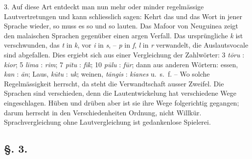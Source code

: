 \label{III.I.I.2B3}3. Auf diese Art entdeckt man nun mehr oder minder regelmässige Lautvertretungen und kann schliesslich sagen: Kehrt das und das Wort in jener Sprache wieder, so muss es so und so lauten. Das Mafoor von Neuguinea zeigt den malaischen Sprachen gegenüber einen argen Verfall. Das ursprüngliche \textit{k} ist verschwunden, das \textit{t} in \textit{k}, vor \textit{i} in \textit{s}, – \textit{p} in \textit{f}, \textit{l} in \textit{r} verwandelt, die Auslautsvocale sind abgefallen. Dies ergiebt sich aus einer Vergleichung der Zahlwörter: 3 \textit{tōru} : \textit{kior}; 5 \textit{līma} : \textit{rim}; 7 \textit{pītu} : \textit{fīk}; 10 \textit{pūlu} : \textit{fūr}; dann aus anderen Wörtern: essen, \textit{kan} : \textit{\=an}; Laus, \textit{k\=utu} : \textit{uk}; weinen, \textit{tāngis} : \textit{kianes} u.~s.~f. – Wo solche Regelmässigkeit herrscht, da steht die Verwandtschaft ausser Zweifel. Die Sprachen sind verschieden, denn die Lautentwickelung hat verschiedene Wege eingeschlagen. Hüben und drüben aber ist sie ihre Wege folgerichtig gegangen; darum herrscht in den Verschiedenheiten Ordnung, nicht Willkür. Sprachvergleichung ohne Lautvergleichung ist gedankenlose Spielerei.

\subsection*{§. 3.}\label{III.I.I.3}
